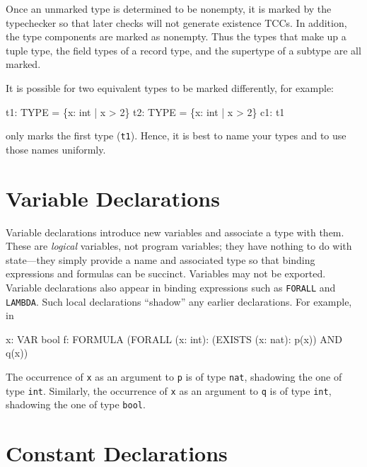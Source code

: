 Once an unmarked type is determined to be nonempty, it is marked by the
typechecker so that later checks will not generate existence TCCs.  In
addition, the type components are marked as nonempty.  Thus the types that
make up a tuple type, the field types of a record type, and the supertype
of a subtype are all marked.

It is possible for two equivalent types to be marked differently, for
example:
\begin{pvsex}
  t1: TYPE = \{x: int | x > 2\}
  t2: TYPE = \{x: int | x > 2\}
  c1: t1
\end{pvsex}
only marks the first type (\texttt{t1}).  Hence, it is best to name your types and
to use those names uniformly.


\section{Variable Declarations}

Variable declarations introduce new variables and associate a type with
them.  These are \emph{logical} variables, not program variables; they
have nothing to do with state---they simply provide a name and associated
type so that binding expressions and formulas can be succinct.
Variables may not be exported.  Variable
declarations also appear in binding expressions such as \texttt{FORALL} and
\texttt{LAMBDA}.  Such local declarations ``shadow'' any earlier
declarations.  For example, in
\begin{pvsex}
  x: VAR bool
  f: FORMULA (FORALL (x: int): (EXISTS (x: nat): p(x)) AND q(x))
\end{pvsex}
%
The occurrence of \texttt{x} as an argument to \texttt{p} is of type
\texttt{nat}, shadowing the one of type \texttt{int}.  Similarly, the
occurrence of \texttt{x} as an argument to \texttt{q} is of type
\texttt{int}, shadowing the one of type \texttt{bool}.


\section{Constant Declarations}\label{constants}

